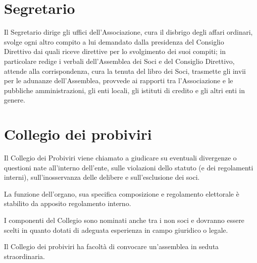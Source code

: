 \documentclass[legalpaper, 11pt]{exam}
\let\tempone\enumerate
\let\temptwo\endenumerate
\renewenvironment{enumerate}{\tempone\addtolength{\itemsep}{-0.45\baselineskip}}{\temptwo}
\begin{document}
\section{Segretario}
\begin{enumerate}
	\item Il Segretario dirige gli uffici dell’Associazione, cura il disbrigo degli affari ordinari, svolge ogni altro compito a lui demandato dalla presidenza del Consiglio Direttivo dai quali riceve direttive per lo svolgimento dei suoi compiti; in particolare redige i verbali dell’Assemblea dei Soci e del Consiglio Direttivo, attende alla corrispondenza, cura la tenuta del libro dei Soci, trasmette gli invii per le adunanze dell’Assemblea, provvede ai rapporti tra l’Associazione e le pubbliche amministrazioni, gli enti locali, gli istituti di credito e gli altri enti in genere.
\end{enumerate}

\section{Collegio dei probiviri}
\begin{enumerate}
 \item Il Collegio dei Probiviri viene chiamato a giudicare su eventuali divergenze o questioni nate all’interno dell’ente, sulle violazioni dello statuto (e dei regolamenti interni), sull’inosservanza delle delibere e sull’esclusione dei soci.
 \item La funzione dell’organo, sua specifica composizione e regolamento elettorale è stabilito da apposito regolamento interno.
 \item I componenti del Collegio sono nominati anche tra i non soci e dovranno essere scelti in quanto dotati di adeguata esperienza in campo giuridico o legale.
 \item Il Collegio dei probiviri ha facoltà di convocare un’assemblea in seduta straordinaria.
\end{enumerate}
\end{document}
